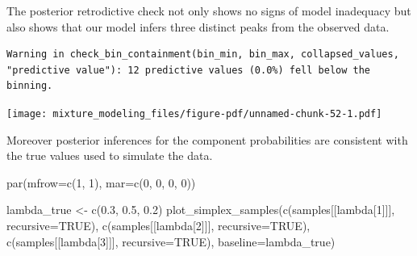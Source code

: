 \documentclass[
  letterpaper,
  DIV=11,
  numbers=noendperiod]{scrartcl}
\newenvironment{Shaded}{\begin{snugshade}}{\end{snugshade}}
\newcommand{\AttributeTok}[1]{\textcolor[rgb]{0.40,0.45,0.13}{#1}}
\newcommand{\ConstantTok}[1]{\textcolor[rgb]{0.56,0.35,0.01}{#1}}
\newcommand{\DecValTok}[1]{\textcolor[rgb]{0.68,0.00,0.00}{#1}}
\newcommand{\FloatTok}[1]{\textcolor[rgb]{0.68,0.00,0.00}{#1}}
\newcommand{\FunctionTok}[1]{\textcolor[rgb]{0.28,0.35,0.67}{#1}}
\newcommand{\NormalTok}[1]{\textcolor[rgb]{0.00,0.23,0.31}{#1}}
\newcommand{\OtherTok}[1]{\textcolor[rgb]{0.00,0.23,0.31}{#1}}
\newcommand{\SpecialCharTok}[1]{\textcolor[rgb]{0.37,0.37,0.37}{#1}}
\newcommand{\StringTok}[1]{\textcolor[rgb]{0.13,0.47,0.30}{#1}}
\begin{document}
The posterior retrodictive check not only shows no signs of model
inadequacy but also shows that our model infers three distinct peaks
from the observed data.

\begin{Shaded}
\end{Shaded}

\begin{verbatim}
Warning in check_bin_containment(bin_min, bin_max, collapsed_values,
"predictive value"): 12 predictive values (0.0%) fell below the binning.
\end{verbatim}

\texttt{[image: mixture\_modeling\_files/figure-pdf/unnamed-chunk-52-1.pdf]}

Moreover posterior inferences for the component probabilities are
consistent with the true values used to simulate the data.

\begin{Shaded}
\begin{Highlighting}[]
\FunctionTok{par}\NormalTok{(}\AttributeTok{mfrow=}\FunctionTok{c}\NormalTok{(}\DecValTok{1}\NormalTok{, }\DecValTok{1}\NormalTok{), }\AttributeTok{mar=}\FunctionTok{c}\NormalTok{(}\DecValTok{0}\NormalTok{, }\DecValTok{0}\NormalTok{, }\DecValTok{0}\NormalTok{, }\DecValTok{0}\NormalTok{))}

\NormalTok{lambda\_true }\OtherTok{\textless{}{-}} \FunctionTok{c}\NormalTok{(}\FloatTok{0.3}\NormalTok{, }\FloatTok{0.5}\NormalTok{, }\FloatTok{0.2}\NormalTok{)}
\FunctionTok{plot\_simplex\_samples}\NormalTok{(}\FunctionTok{c}\NormalTok{(samples[[}\StringTok{\textquotesingle{}lambda[1]\textquotesingle{}}\NormalTok{]], }\AttributeTok{recursive=}\ConstantTok{TRUE}\NormalTok{),}
                     \FunctionTok{c}\NormalTok{(samples[[}\StringTok{\textquotesingle{}lambda[2]\textquotesingle{}}\NormalTok{]], }\AttributeTok{recursive=}\ConstantTok{TRUE}\NormalTok{),}
                     \FunctionTok{c}\NormalTok{(samples[[}\StringTok{\textquotesingle{}lambda[3]\textquotesingle{}}\NormalTok{]], }\AttributeTok{recursive=}\ConstantTok{TRUE}\NormalTok{),}
                     \AttributeTok{baseline=}\NormalTok{lambda\_true)}
\end{Highlighting}
\end{Shaded}
\end{document}

